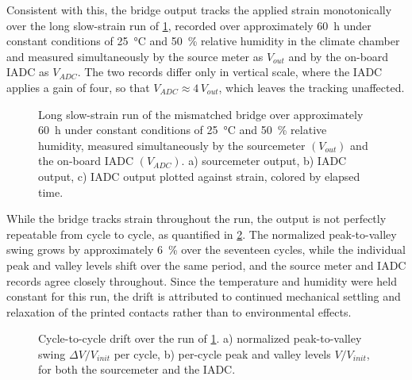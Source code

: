 Consistent with this, the bridge output tracks the applied strain monotonically over the long slow-strain run of \cref{fig:Slope1}, recorded over approximately \SI{60}{\hour} under constant conditions of \SI{25}{\celsius} and \SI{50}{\percent} relative humidity in the climate chamber and measured simultaneously by the source meter as \(V_{out}\) and by the on-board IADC as \(V_{ADC}\). The two records differ only in vertical scale, where the IADC applies a gain of four, so that \(V_{ADC}\approx 4\,V_{out}\), which leaves the tracking unaffected.

\begin{figure}[!t]
\centering

    \caption{Long slow-strain run of the mismatched bridge over approximately \SI{60}{\hour} under constant conditions of \SI{25}{\celsius} and \SI{50}{\percent} relative humidity, measured simultaneously by the sourcemeter \(\left(V_{out}\right)\) and the on-board IADC \(\left(V_{ADC}\right)\). a) sourcemeter output, b) IADC output, c) IADC output plotted against strain, colored by elapsed time.}
    \label{fig:Slope1}
\end{figure}

While the bridge tracks strain throughout the run, the output is not perfectly repeatable from cycle to cycle, as quantified in \cref{fig:Slope2}. The normalized peak-to-valley swing grows by approximately \SI{6}{\percent} over the seventeen cycles, while the individual peak and valley levels shift over the same period, and the source meter and IADC records agree closely throughout. Since the temperature and humidity were held constant for this run, the drift is attributed to continued mechanical settling and relaxation of the printed contacts rather than to environmental effects.

\begin{figure}
\centering

    \caption{Cycle-to-cycle drift over the run of \cref{fig:Slope1}. a) normalized peak-to-valley swing \(\Delta V/V_{init}\) per cycle, b) per-cycle peak and valley levels \(V/V_{init}\), for both the sourcemeter and the IADC.}
    \label{fig:Slope2}
\end{figure}

